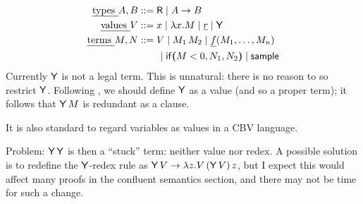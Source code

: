 
\begin{align*}
  \text{\em types } A, B &::= \textsf{R}  \mid  A \to B \\
  \text{\em values } V &::= x \mid \lambda x.M  \mid  \underline{r} \mid \mathsf{Y} \\
  \text{\em terms } M, N &::= V  \mid  M_1 \, M_2  \mid  \underline{f}(M_1,\dots ,M_n) \\
   & \qquad \mid  \mathsf{if}\boldsymbol{(}M < 0, N_1, N_2\boldsymbol{)}  \mid  \mathsf{sample}
\end{align*}
Currently $\mathsf{Y}$ is not a legal term. This is unnatural: there is no reason to so restrict $\mathsf{Y}$. Following \citep[p.~376]{DBLP:conf/fsttcs/Sieber90}, we should define $\mathsf{Y}$ as a value (and so a proper term); it follows that $\mathsf{Y} \, M$ is redundant as a clause.

It is also standard to regard variables as values in a CBV language.

Problem: $\mathsf{Y} \, \mathsf{Y}$ is then a ``stuck'' term: neither value nor redex. A possible solution is to redefine the $\mathsf{Y}$-redex rule as $\mathsf{Y} \, V \to \lambda z . V \, (\mathsf{Y} \, V) \, z$, but I expect this would affect many proofs in the confluent semantics section, and there may not be time for such a change.

